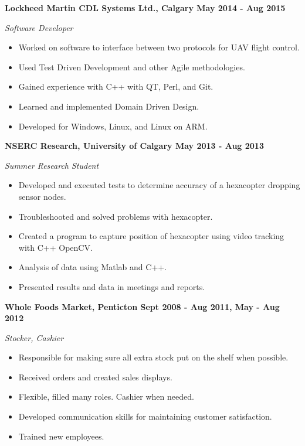 \documentclass[12pt]{article}
\begin{document}
\noindent \centerline{ \bf Lockheed Martin CDL Systems Ltd., Calgary \hfill May 2014 - Aug 2015}
\indent \emph{ Software Developer }
\begin{itemize}
  \item Worked on software to interface between two protocols for UAV flight control.
  \item Used Test Driven Development and other Agile methodologies.
  \item Gained experience with C++ with QT, Perl, and Git.
  \item Learned and implemented Domain Driven Design.
  \item Developed for Windows, Linux, and Linux on ARM.
\end{itemize}

\noindent \centerline{ \bf NSERC Research, University of Calgary \hfill May 2013 - Aug 2013}
\indent \emph{ Summer Research Student }
\begin{itemize}
  \item Developed and executed tests to determine accuracy of a hexacopter dropping sensor nodes.
  \item Troubleshooted and solved problems with hexacopter.
  \item Created a program to capture position of hexacopter using video tracking with C++ OpenCV.
  \item Analysis of data using Matlab and C++.
  \item Presented results and data in meetings and reports.
\end{itemize}

\noindent \centerline{ \bf Whole Foods Market, Penticton \hfill Sept 2008 - Aug 2011, May - Aug 2012}
\indent \emph{Stocker, Cashier}
\begin{itemize}
  \item Responsible for making sure all extra stock put on the shelf when possible.
  \item Received orders and created sales displays.
  \item Flexible, filled many roles. Cashier when needed.
  \item Developed communication skills for maintaining customer satisfaction.
  \item Trained new employees.
\end{itemize}

\bigskip
{}
\bigskip
\end{document}
